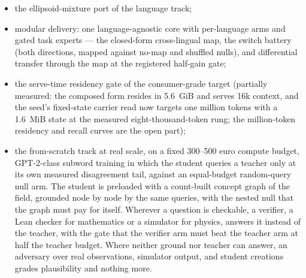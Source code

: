 \documentclass[11pt]{article}
\begin{document}
\begin{itemize}
  step's own cost reported either way;
\item the ellipsoid-mixture port of the language track;
\item modular delivery: one language-agnostic core with
  per-language arms and gated task experts --- the closed-form
  cross-lingual map, the switch battery (both directions, mapped
  against no-map and shuffled nulls), and differential transfer
  through the map at the registered half-gain gate;
\item the serve-time residency gate of the consumer-grade target
  (partially measured: the composed form resides in 5.6~GiB and
  serves 16k context, and the seed's fixed-state carrier read now
  targets one million tokens with a 1.6~MiB state at the measured
  eight-thousand-token rung; the million-token residency and
  recall curves are the open part);
\item the from-scratch track at real scale, on a fixed 300--500 euro
  compute budget, GPT-2-class subword training in which the student
  queries a teacher only at its own measured disagreement tail,
  against an equal-budget random-query null arm. The student is
  preloaded with a count-built concept graph of the field, grounded
  node by node by the same queries, with the nested null that the
  graph must pay for itself. Wherever a question is checkable, a
  verifier, a Lean checker for mathematics or a simulator for
  physics, answers it instead of the teacher, with the gate that
  the verifier arm must beat the teacher arm at half the teacher
  budget. Where neither ground nor teacher can answer, an adversary
  over real observations, simulator output, and student creations
  grades plausibility and nothing more.
\end{itemize}
\end{document}
